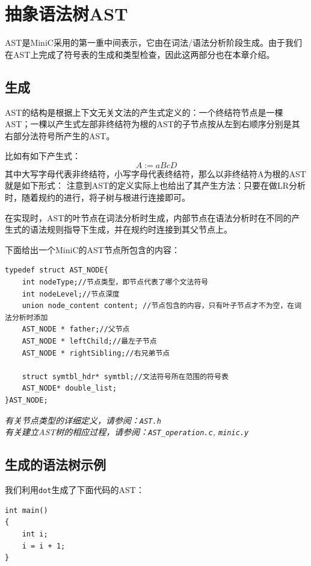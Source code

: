 \section{抽象语法树AST}
\label{AST}
AST是MiniC采用的第一重中间表示，它由在词法/语法分析阶段生成。由于我们在AST上完成了符号表的生成和类型检查，因此这两部分也在本章介绍。
\subsection{生成}
\label{genAST}
AST的结构是根据上下文无关文法的产生式定义的：一个终结符节点是一棵AST；一棵以产生式左部非终结符为根的AST的子节点按从左到右顺序分别是其右部分法符号所产生的AST。

比如有如下产生式：
\begin{displaymath}
	A:=aBcD
\end{displaymath}
其中大写字母代表非终结符，小写字母代表终结符，那么以非终结符A为根的AST就是如下形式：
注意到AST的定义实际上也给出了其产生方法：只要在做LR分析时，随着规约的进行，将子树与根进行连接即可。

在实现时，AST的叶节点在词法分析时生成，内部节点在语法分析时在不同的产生式的语法规则指导下生成，并在规约时连接到其父节点上。

下面给出一个MiniC的AST节点所包含的内容：
\label{ASTnode}
\begin{lstlisting}
typedef struct AST_NODE{
  	int nodeType;//节点类型，即节点代表了哪个文法符号
  	int nodeLevel;//节点深度
	union node_content content; //节点包含的内容，只有叶子节点才不为空，在词法分析时添加
  	AST_NODE * father;//父节点
  	AST_NODE * leftChild;//最左子节点
  	AST_NODE * rightSibling;//右兄弟节点

	struct symtbl_hdr* symtbl;//文法符号所在范围的符号表
	AST_NODE* double_list;
}AST_NODE;
\end{lstlisting}
{\it \anchor 有关节点类型的详细定义，请参阅：\verb|AST.h|}\\
{\it \anchor 有关建立AST树的相应过程，请参阅：\verb|AST_operation.c|, \verb|minic.y|}\\
\subsection{生成的语法树示例}
我们利用\verb|dot|生成了下面代码的AST：
\begin{lstlisting}
int main()
{
	int i;
	i = i + 1;
}

\end{lstlisting}

